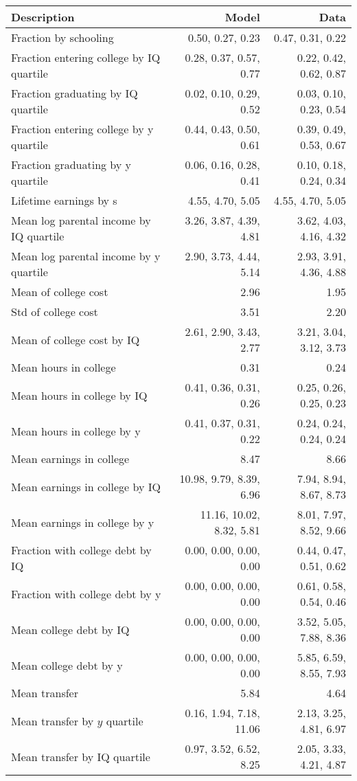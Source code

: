 \begin{tabular}{lrr}
\hline
Description & Model  & Data  \\
\hline
Fraction by schooling & 0.50, 0.27, 0.23  & 0.47, 0.31, 0.22  \\
Fraction entering college by IQ quartile & 0.28, 0.37, 0.57, 0.77  & 0.22, 0.42, 0.62, 0.87  \\
Fraction graduating by IQ quartile & 0.02, 0.10, 0.29, 0.52  & 0.03, 0.10, 0.23, 0.54  \\
Fraction entering college by y quartile & 0.44, 0.43, 0.50, 0.61  & 0.39, 0.49, 0.53, 0.67  \\
Fraction graduating by y quartile & 0.06, 0.16, 0.28, 0.41  & 0.10, 0.18, 0.24, 0.34  \\
Lifetime earnings by s & 4.55, 4.70, 5.05  & 4.55, 4.70, 5.05  \\
Mean log parental income by IQ quartile & 3.26, 3.87, 4.39, 4.81  & 3.62, 4.03, 4.16, 4.32  \\
Mean log parental income by y quartile & 2.90, 3.73, 4.44, 5.14  & 2.93, 3.91, 4.36, 4.88  \\
Mean of college cost & 2.96  & 1.95  \\
Std of college cost & 3.51  & 2.20  \\
Mean of college cost by IQ & 2.61, 2.90, 3.43, 2.77  & 3.21, 3.04, 3.12, 3.73  \\
Mean hours in college & 0.31  & 0.24  \\
Mean hours in college by IQ & 0.41, 0.36, 0.31, 0.26  & 0.25, 0.26, 0.25, 0.23  \\
Mean hours in college by y & 0.41, 0.37, 0.31, 0.22  & 0.24, 0.24, 0.24, 0.24  \\
Mean earnings in college & 8.47  & 8.66  \\
Mean earnings in college by IQ & 10.98, 9.79, 8.39, 6.96  & 7.94, 8.94, 8.67, 8.73  \\
Mean earnings in college by y & 11.16, 10.02, 8.32, 5.81  & 8.01, 7.97, 8.52, 9.66  \\
Fraction with college debt by IQ & 0.00, 0.00, 0.00, 0.00  & 0.44, 0.47, 0.51, 0.62  \\
Fraction with college debt by y & 0.00, 0.00, 0.00, 0.00  & 0.61, 0.58, 0.54, 0.46  \\
Mean college debt by IQ & 0.00, 0.00, 0.00, 0.00  & 3.52, 5.05, 7.88, 8.36  \\
Mean college debt by y & 0.00, 0.00, 0.00, 0.00  & 5.85, 6.59, 8.55, 7.93  \\
Mean transfer & 5.84  & 4.64  \\
Mean transfer by $y$ quartile & 0.16, 1.94, 7.18, 11.06  & 2.13, 3.25, 4.81, 6.97  \\
Mean transfer by IQ quartile & 0.97, 3.52, 6.52, 8.25  & 2.05, 3.33, 4.21, 4.87  \\
\hline
\end{tabular}%
